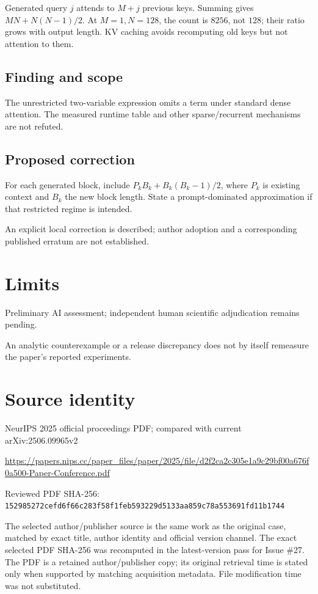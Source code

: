 \documentclass[11pt]{article}
\begin{document}
Generated query \(j\) attends to \(M+j\) previous keys. Summing gives \(MN+N(N-1)/2\). At \(M=1,N=128\), the count is \(8256\), not \(128\); their ratio grows with output length. KV caching avoids recomputing old keys but not attention to them.

\subsection*{Finding and scope}

The unrestricted two-variable expression omits a term under standard dense attention. The measured runtime table and other sparse/recurrent mechanisms are not refuted.

\subsection*{Proposed correction}

For each generated block, include \(P_kB_k+B_k(B_k-1)/2\), where \(P_k\) is existing context and \(B_k\) the new block length. State a prompt-dominated approximation if that restricted regime is intended.

An explicit local correction is described; author adoption and a corresponding published erratum are not established.

\section*{Limits}

Preliminary AI assessment; independent human scientific adjudication remains pending.\par

An analytic counterexample or a release discrepancy does not by itself remeasure the paper’s reported experiments.\par

\section*{Source identity}

NeurIPS 2025 official proceedings PDF; compared with current arXiv:2506.09965v2

\url{https://papers.nips.cc/paper_files/paper/2025/file/d2f2ca2c305e1a9c29bf00a676f0a500-Paper-Conference.pdf}

Reviewed PDF SHA-256: \nolinkurl{152985272cefd6f66c283f58f1feb593229d5133aa859c78a553691fd11b1744}

The selected author/publisher source is the same work as the original case, matched by exact title, author identity and official version channel. The exact selected PDF SHA-256 was recomputed in the latest-version pass for Issue \#27. The PDF is a retained author/publisher copy; its original retrieval time is stated only when supported by matching acquisition metadata. File modification time was not substituted.
\end{document}
